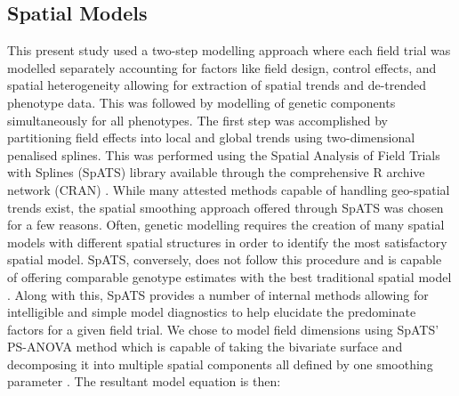 \begin{table}

\caption{\label{tab:location-table}Agronomic properties of the screening trials conducted in Est and Heelsum}
\centering
{}
\end{table}

\subsection{Spatial Models}

This present study used a two-step modelling approach where each field trial was modelled separately accounting for factors like field design, control effects, and spatial heterogeneity allowing for extraction of spatial trends and de-trended phenotype data. This was followed by modelling of genetic components simultaneously for all phenotypes. The first step was accomplished by partitioning field effects into local and global trends using two-dimensional penalised splines. This was performed using the Spatial Analysis of Field Trials with Splines (SpATS) library available through the comprehensive R archive network (CRAN) \citep{Rodriguez-Alvarez2018}. While many attested methods capable of handling geo-spatial trends exist, the spatial smoothing approach offered through SpATS was chosen for a few reasons. Often, genetic modelling requires the creation of many spatial models with different spatial structures in order to identify the most satisfactory spatial model. SpATS, conversely, does not follow this procedure and is capable of offering comparable genotype estimates with the best traditional spatial model \citep{Velazco2017}. Along with this, SpATS provides a number of internal methods allowing for intelligible and simple model diagnostics to help elucidate the predominate factors for a given field trial. We chose to model field dimensions using SpATS' PS-ANOVA method which is capable of taking the bivariate surface and decomposing it into multiple spatial components all defined by one smoothing parameter \citep{Lee2013}. The resultant model equation is then:

